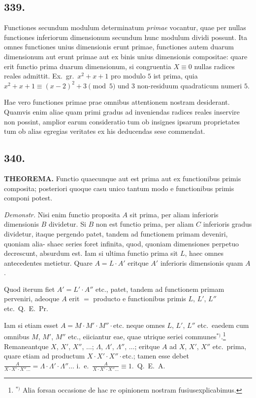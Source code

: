 \documentclass[12pt,a4paper]{article}
\begin{document}
\subsection*{339.}

Functiones secundum modulum determinatum \textit{primae} vocantur, quae per nullas functiones inferiorum dimensionum secundum hunc modulum dividi possunt. Ita omnes functiones unius dimensionis erunt primae, functiones autem duarum dimensionum aut erunt primae aut ex binis unius dimensionis compositae: quare erit functio prima duarum dimensionum, si congruentia $X\equiv 0$ nullas radices reales admittit. Ex.~gr.~$x^2+x+1$ pro modulo $5$ ist prima, quia $x^2+x+1 \equiv (x-2)^2+3\pmod{5}$ und $3$ non-residuum quadraticum numeri $5$.

Hae vero functiones primae prae omnibus attentionem nostram desiderant. Quamvis enim aliae quam primi gradus ad inveniendas radices reales inservire non possint, amplior earum consideratio tum ob insignes ipsarum proprietates tum ob alias egregias veritates ex his deducendas sese commendat.

\subsection*{340.}

\textbf{THEOREMA.} Functio quaecunque aut est prima aut ex functionibus primis composita; posteriori quoque casu unico tantum modo e functionibus primis componi potest.

\textit{Demonstr.} Nisi enim functio proposita $A$ sit prima, per aliam inferioris dimensionis $B$ dividetur. Si $B$ non est functio prima, per aliam $C$ inferioris gradus dividetur, itaque pergendo patet, tandem ad functionem primam deveniri, quoniam alia- shaec series foret infinita, quod, quoniam dimensiones perpetuo decrescunt, absurdum est. Iam si ultima functio prima sit $L$, haec omnes antecedentes metietur. Quare $A=L\cdot A'$ eritque $A'$ inferioris dimensionis quam $A$.

Quod iterum fiet $A'=L'\cdot A''$ etc., patet, tandem ad functionem primam perveniri, adeoque $A$ erit $=$ producto e functionibus primis $L$, $L'$, $L''$ etc.~Q.~E.~Pr.

Iam si etiam esset $A=M\cdot M'\cdot M''\cdot \text{etc.}$ neque omnes $L$, $L'$, $L''$ etc.~eaedem cum omnibus $M$, $M'$, $M''$ etc., eiiciantur eae, quae utrique seriei communes$^{*)}$.\footnote{$^{*)}$ Alia forsan occasione de hac re opinionem nostram fusiusexplicabimus.} Remaneantque $X$, $X'$, $X''$, $\ldots$; $\Lambda$, $\Lambda'$, $\Lambda''$, $\ldots$; eritque $A$ ad $X$, $X'$, $X''$ etc.~prima, quare etiam ad productum $X\cdot X'\cdot X''\cdot \text{etc.}$; tamen esse debet $\frac{A}{X\cdot X'\cdot X''\ldots} = \Lambda\cdot \Lambda'\cdot \Lambda''\ldots$ i.~e.~$\frac{A}{X\cdot X'\cdot X''\ldots} \equiv 1$.~Q.~E.~A.
\end{document}
